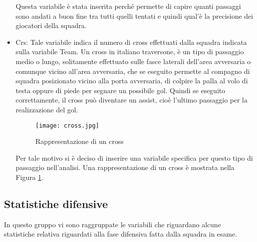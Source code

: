\begin{itemize}
	Questa variabile è stata inserita perché permette di capire quanti passaggi sono andati a buon fine tra tutti quelli tentati e quindi qual'è la precisione dei giocatori della squadra.
	
	\item \textsf{Crs}: Tale variabile indica il numero di cross effettuati dalla squadra indicata sulla variabile \textsf{Team}. Un cross in italiano traversone, è un tipo di passaggio medio o lungo, solitamente effettuato sulle fasce laterali dell'area avversaria o comunque vicino all'area avversaria, che se eseguito permette al compagno di squadra posizionato vicino alla porta avversaria, di colpire la palla al volo di testa oppure di piede per segnare un possibile gol. Quindi se eseguito correttamente, il cross può diventare un assist, cioè l'ultimo passaggio per la realizzazione del gol. 
	
	\begin{figure}[!ht]
		\begin{center}
			\texttt{[image: cross.jpg]}
			\caption{Rappresentazione di un cross} \label{fig:cross}
		\end{center}
	\end{figure}
	
	Per tale motivo si è deciso di inserire una variabile specifica per questo tipo di passaggio nell'analisi. Una rappresentazione di un cross è mostrata nella Figura \ref{fig:cross}.
\end{itemize}

\subsection{Statistiche difensive}

In questo gruppo vi sono raggruppate le variabili che riguardano alcune statistiche relativa riguardati alla fase difensiva fatta dalla squadra in esame.

